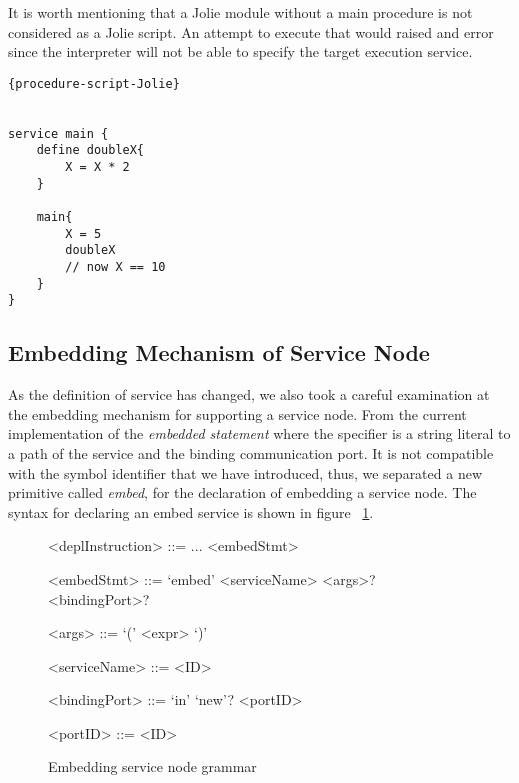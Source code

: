 It is worth mentioning that a Jolie module without a main procedure is not considered as a Jolie script. An attempt to execute that would raised and error since the interpreter will not be able to specify the target execution service.

\begin{listing}[h]
    \lstset{language=Jolie,
        style=codeStyle
    }
    \begin{lstlisting}[frame=tlrb, caption= {A Jolie script version of ~\ref{list:procedure}}, label={list:jolie-procedure-script}]{procedure-script-Jolie}


service main {
    define doubleX{
        X = X * 2
    }

    main{
        X = 5
        doubleX
        // now X == 10
    }
}
\end{lstlisting}
\end{listing}

\subsection{Embedding Mechanism of Service Node}

As the definition of service has changed, we also took a careful examination at the embedding mechanism for supporting a service node.
From the current implementation of the \textit{embedded statement} where the specifier is a string literal to a path of the service and the binding communication port. It is not compatible with the symbol identifier that we have introduced, thus, we separated a new primitive called \textit{embed}, for the declaration of embedding a service node.
The syntax for declaring an embed service is shown in figure ~\ref{fig:jolie-servicenode-embed-grammar}.


\begin{figure}[h]
    \begin{framed}
        \begin{grammar}
            <deplInstruction> ::= ...
            \alt <embedStmt>

            <embedStmt> ::= `embed' <serviceName> <args>? <bindingPort>?

            <args> ::= `(' <expr> `)'

            <serviceName> ::= <ID>

            <bindingPort> ::= `in' `new'? <portID>

            <portID> ::= <ID>

        \end{grammar}
    \end{framed}
    \caption{Embedding service node grammar}
    \label{fig:jolie-servicenode-embed-grammar}
\end{figure}

